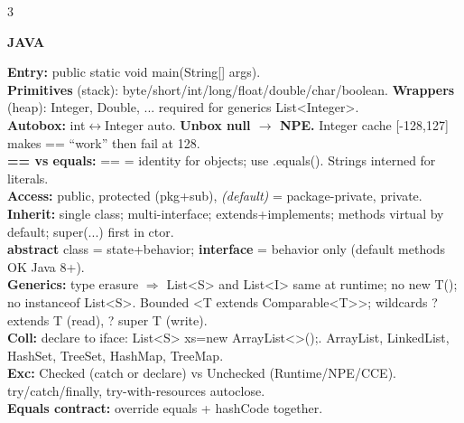 \documentclass[10pt,letterpaper]{article}
\newenvironment{topic}[1]{%
  \par\addvspace{1.5pt}%
  \noindent\colorbox{hdrBG}{%
    \begin{minipage}{\dimexpr\linewidth-2\fboxsep\relax}%
      \centering\bfseries\sffamily\fontsize{6pt}{7pt}\selectfont\color{hdrFG}\MakeUppercase{#1}%
    \end{minipage}%
  }\par\nobreak\vskip0.5pt%
  \begingroup\setlength{\leftskip}{0pt}\setlength{\rightskip}{0pt}%
}{%
  \endgroup\par\addvspace{0.5pt}%
}
\newcommand{\warn}[1]{\textcolor{warnC}{\textbf{#1}}}
\newcommand{\hd}[1]{\textcolor{accent}{\textbf{#1}}}
\newcommand{\cn}[1]{{\ttfamily\small #1}}
\begin{document}
\begin{multicols*}{3}
\begin{topic}{Java}
\hd{Entry:} \cn{public static void main(String[] args)}.\\
\hd{Primitives} (stack): byte/short/int/long/float/double/char/boolean. \hd{Wrappers} (heap): Integer, Double, ... required for generics \cn{List<Integer>}.\\
\hd{Autobox:} int$\leftrightarrow$Integer auto. \warn{Unbox null $\to$ NPE.} Integer cache [-128,127] makes \cn{==} ``work'' then fail at 128.\\
\hd{== vs equals:} \cn{==} = identity for objects; use \cn{.equals()}. Strings interned for literals.\\
\hd{Access:} \cn{public}, \cn{protected} (pkg+sub), \emph{(default)} = package-private, \cn{private}.\\
\hd{Inherit:} single class; multi-interface; \cn{extends}+\cn{implements}; methods virtual by default; \cn{super(...)} first in ctor.\\
\hd{abstract} class = state+behavior; \hd{interface} = behavior only (default methods OK Java 8+).\\
\hd{Generics:} type erasure $\Rightarrow$ \cn{List<S>} and \cn{List<I>} same at runtime; no \cn{new T()}; no \cn{instanceof List<S>}. Bounded \cn{<T extends Comparable<T>>}; wildcards \cn{? extends T} (read), \cn{? super T} (write).\\
\hd{Coll:} declare to iface: \cn{List<S> xs=new ArrayList<>();}. \cn{ArrayList, LinkedList, HashSet, TreeSet, HashMap, TreeMap}.\\
\hd{Exc:} Checked (catch or declare) vs Unchecked (Runtime/NPE/CCE). \cn{try/catch/finally}, \cn{try-with-resources} autoclose.\\
\hd{Equals contract:} override \cn{equals} + \cn{hashCode} together.
\end{topic}


\end{multicols*}
\end{document}
